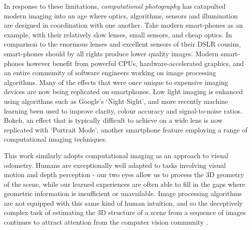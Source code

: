 In response to these limitations, \textit{computational photography} has catapulted modern imaging into an age where optics, algorithms, sensors and illumination are designed in coordination with one another. Take modern smart-phones as an example, with their relatively slow lenses, small sensors, and cheap optics. In comparison to the enormous lenses and excellent sensors of their DSLR cousins, smart-phones should by all rights produce lower quality images. Modern smart-phones however benefit from powerful CPUs, hardware-accelerated graphics, and an entire community of software engineers working on image processing algorithms. Many of the effects that were once unique to expensive imaging devices are now being replicated on smartphones. Low light imaging is enhanced using algorithms such as Google's `Night Sight', and more recently machine learning been used to improve clarity, colour accuracy and signal-to-noise ratios. Bokeh, an effect that is typically difficult to achieve on a wide lens is now replicated with `Portrait Mode', another smartphone feature employing a range of computational imaging techniques.

This work similarly adopts computational imaging as an approach to visual odometry. Humans are exceptionally well adapted to tasks involving visual motion and depth perception - our two eyes allow us to process the 3D geometry of the scene, while our learned experiences are often able to fill in the gaps where geometric information is insufficient or unavailable. Image processing algorithms are not equipped with this same kind of human intuition, and so the deceptively complex task of estimating the 3D structure of a scene from a sequence of images continues to attract attention from the computer vision community \cite{dansereau2011plenopticflow,nister2004vo,gakne2018scale,zhou2019scale}. 

